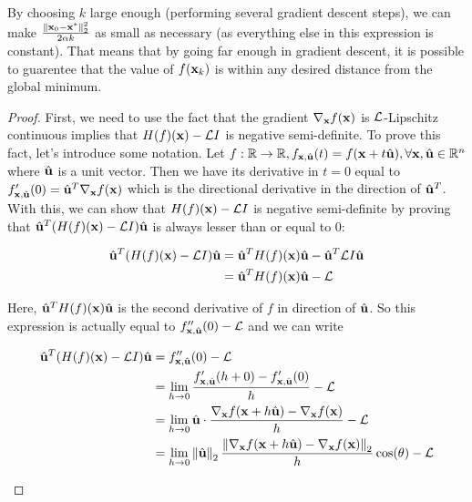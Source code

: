 \begin{remark}
    By choosing $k$ large enough (performing several gradient descent steps), we can make $\frac{\norm{\vx_0 - \vx^*}_2^2}{2\alpha k}$ as small as necessary (as everything else in this expression is constant). That means that by going far enough in gradient descent, it is possible to guarentee that the value of $f(\vx_k)$ is within any desired distance from the global minimum.
\end{remark}

\begin{proof}

    \label{proof-theoreme-gd-converge}
    First, we need to use the fact that the gradient $\nabla_\vx f(\vx)$ is $\Lip$-Lipschitz continuous implies that $H(f)(\vx) - \Lip I$ is negative semi-definite. To prove this fact, let's introduce some notation. Let $f : \R \rightarrow \R, f_{\vx,\vuhat}(t) = f(\vx + t\vuhat),   \forall \vx,\vuhat \in \R^n$ where $\vuhat$ is a unit vector. Then we have its derivative in $t=0$ equal to $f'_{\vx,\vuhat}(0) = \vuhat^T \nabla_\vx f(\vx)$ which is the directional derivative in the direction of $\vuhat^T$. With this, we can show that $H(f)(\vx) - \Lip I$ is negative semi-definite by proving that $\vuhat^T(H(f)(\vx) - \Lip I) \vuhat$ is always lesser than or equal to 0:
    \begin{ceqn}
        \begin{align*}
            \vuhat^T(H(f)(\vx) - \Lip I) \vuhat &= \vuhat^T H(f)(\vx)\vuhat - \vuhat^T \Lip I \vuhat \\
            &= \vuhat^T H(f)(\vx)\vuhat - \Lip
        \end{align*}
    \end{ceqn}
    Here, $\vuhat^T H(f)(\vx)\vuhat$ is the second derivative of $f$ in direction of $\vuhat$. So this expression is actually equal to $f''_{\vx,\vuhat}(0) - \Lip$ and we can write 
    \begin{ceqn}
        \begin{align*}
            \vuhat^T(H(f)(\vx) - \Lip I) \vuhat &= f''_{\vx,\vuhat}(0) - \Lip \\
            &= \lim_{h \to 0} \frac{f'_{\vx,\vuhat}(h + 0) - f'_{\vx,\vuhat}(0)}{h} - \Lip \\
            &= \lim_{h \to 0} \vuhat \cdot \frac{\nabla_\vx f(\vx + h\vuhat) - \nabla_\vx f(\vx)}{h} - \Lip \\
            &= \lim_{h \to 0} \norm{\vuhat}_2 \frac{\norm{\nabla_\vx f(\vx + h\vuhat) - \nabla_\vx f(\vx)}_2}{h} \cos(\theta) - \Lip \\

\end{align*}
\end{ceqn}
\end{proof}
